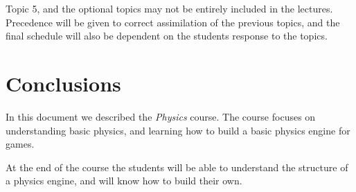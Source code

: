 \documentclass{article}
\begin{document}
Topic 5, and the optional topics may not be entirely included in the lectures. Precedence will be given to correct assimilation of the previous topics, and the final schedule will also be dependent on the students response to the topics.

\section{Conclusions}
In this document we described the \textit{Physics} course. The course focuses on understanding basic physics, and learning how to build a basic physics engine for games.

At the end of the course the students will be able to understand the structure of a physics engine, and will know how to build their own.
\end{document}
